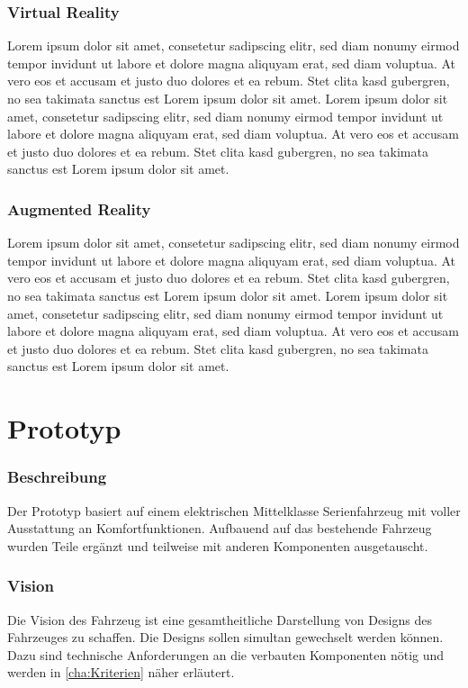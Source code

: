 \subsection{Virtual Reality}
Lorem ipsum dolor sit amet, consetetur sadipscing elitr, sed diam nonumy eirmod tempor invidunt ut labore et dolore magna aliquyam erat, sed diam voluptua. At vero eos et accusam et justo duo dolores et ea rebum. Stet clita kasd gubergren, no sea takimata sanctus est Lorem ipsum dolor sit amet. Lorem ipsum dolor sit amet, consetetur sadipscing elitr, sed diam nonumy eirmod tempor invidunt ut labore et dolore magna aliquyam erat, sed diam voluptua. At vero eos et accusam et justo duo dolores et ea rebum. Stet clita kasd gubergren, no sea takimata sanctus est Lorem ipsum dolor sit amet.
\subsection{Augmented Reality}
Lorem ipsum dolor sit amet, consetetur sadipscing elitr, sed diam nonumy eirmod tempor invidunt ut labore et dolore magna aliquyam erat, sed diam voluptua. At vero eos et accusam et justo duo dolores et ea rebum. Stet clita kasd gubergren, no sea takimata sanctus est Lorem ipsum dolor sit amet. Lorem ipsum dolor sit amet, consetetur sadipscing elitr, sed diam nonumy eirmod tempor invidunt ut labore et dolore magna aliquyam erat, sed diam voluptua. At vero eos et accusam et justo duo dolores et ea rebum. Stet clita kasd gubergren, no sea takimata sanctus est Lorem ipsum dolor sit amet.

\chapter{Prototyp}
\label{cha:Prototyp}
\subsection{Beschreibung}
Der Prototyp basiert auf einem elektrischen Mittelklasse Serienfahrzeug mit voller Ausstattung an Komfortfunktionen. Aufbauend auf das bestehende Fahrzeug wurden Teile ergänzt und teilweise mit anderen Komponenten ausgetauscht.
\subsection{Vision}
Die Vision des Fahrzeug ist eine gesamtheitliche Darstellung von Designs des Fahrzeuges zu schaffen. Die Designs sollen simultan gewechselt werden können. Dazu sind technische Anforderungen an die verbauten Komponenten nötig und werden in \ref{cha:Kriterien} näher erläutert.
